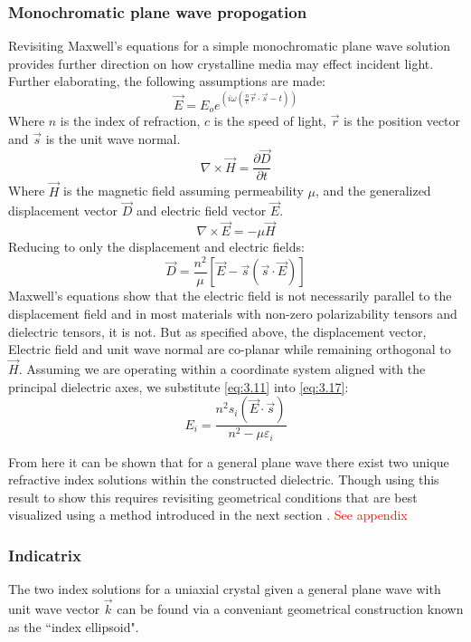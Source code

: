 \subsubsection{Monochromatic plane wave propogation}
Revisiting Maxwell's equations for a simple monochromatic plane wave solution provides further direction on how crystalline media may effect incident light. Further elaborating, the following assumptions are made:
\begin{equation}
\vec{E} = E_o e^{(i \omega (\frac{n}{c} \vec{r}\cdot \vec{s}-t))}
\end{equation}
Where $n$ is the index of refraction, $c$ is the speed of light, $\vec{r}$ is the position vector and $\vec{s}$ is the unit wave normal.
\begin{equation}
\nabla \times \vec{H}= \frac{\partial \vec{D}}{\partial t}
\end{equation}
Where $\vec{H}$ is the magnetic field assuming permeability $\mu$, and the generalized displacement vector $\vec{D}$ and electric field vector $\vec{E}$.
\begin{equation}
\nabla \times \vec{E} = -\mu \vec{H}
\end{equation}
Reducing to only the displacement and electric fields:
\begin{equation}\label{eq:3.17}
\vec{D} = \frac{n^2}{\mu}[\vec{E}-\vec{s}(\vec{s}\cdot \vec{E})]
\end{equation}
Maxwell's equations show that the electric field is not necessarily parallel to the displacement field and in most materials with non-zero polarizability tensors and dielectric tensors, it is not. But as specified above, the displacement vector, Electric field and unit wave normal are co-planar while remaining orthogonal to $\vec{H}$. Assuming we are operating within a coordinate system aligned with the principal dielectric axes, we substitute \ref{eq:3.11} into \ref{eq:3.17}:
\begin{equation}\label{eq:3.18}
E_i = \frac{n^2 s_i (\vec{E}\cdot\vec{s})}{n^2 - \mu \varepsilon_i}
\end{equation}

From here it can be shown that for a general plane wave there exist two unique refractive index solutions within the constructed dielectric. Though using this result to show this requires revisiting geometrical conditions that are best visualized using a method introduced in the next section \cite{nye}. \textcolor{red}{See appendix}

\subsubsection{Indicatrix}\label{sec:indicatrix}
The two index solutions for a uniaxial crystal given a general plane wave with unit wave vector $\vec{k}$ can be found via a conveniant geometrical construction known as the ``index ellipsoid". 

